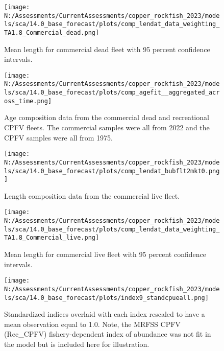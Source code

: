 \documentclass[11pt,
  english,
  letterpaper,
]{article}
\begin{document}
\pagebreak

\begin{figure}
\centering
\texttt{[image: N:/Assessments/CurrentAssessments/copper\_rockfish\_2023/models/sca/14.0\_base\_forecast/plots/comp\_lendat\_data\_weighting\_TA1.8\_Commercial\_dead.png]}
\caption{Mean length for commercial dead fleet with 95 percent confidence intervals.\label{fig:mean-com-dead-len-data}}
\end{figure}

\pagebreak

\begin{figure}
\centering
\texttt{[image: N:/Assessments/CurrentAssessments/copper\_rockfish\_2023/models/sca/14.0\_base\_forecast/plots/comp\_agefit\_\_aggregated\_across\_time.png]}
\caption{Age composition data from the commercial dead and recreational CPFV fleets. The commercial samples were all from 2022 and the CPFV samples were all from 1975.\label{fig:com-dead-age-data}}
\end{figure}

\pagebreak

\begin{figure}
\centering
\texttt{[image: N:/Assessments/CurrentAssessments/copper\_rockfish\_2023/models/sca/14.0\_base\_forecast/plots/comp\_lendat\_bubflt2mkt0.png]}
\caption{Length composition data from the commercial live fleet.\label{fig:com-live-len-data}}
\end{figure}

\pagebreak

\begin{figure}
\centering
\texttt{[image: N:/Assessments/CurrentAssessments/copper\_rockfish\_2023/models/sca/14.0\_base\_forecast/plots/comp\_lendat\_data\_weighting\_TA1.8\_Commercial\_live.png]}
\caption{Mean length for commercial live fleet with 95 percent confidence intervals.\label{fig:mean-com-live-len-data}}
\end{figure}

\pagebreak

\begin{figure}
\centering
\texttt{[image: N:/Assessments/CurrentAssessments/copper\_rockfish\_2023/models/sca/14.0\_base\_forecast/plots/index9\_standcpueall.png]}
\caption{Standardized indices overlaid with each index rescaled to have a mean observation equal to 1.0. Note, the MRFSS CPFV (Rec\_CPFV) fishery-dependent index of abundance was not fit in the model but is included here for illustration.\label{fig:stand-cpue}}
\end{figure}
\end{document}
